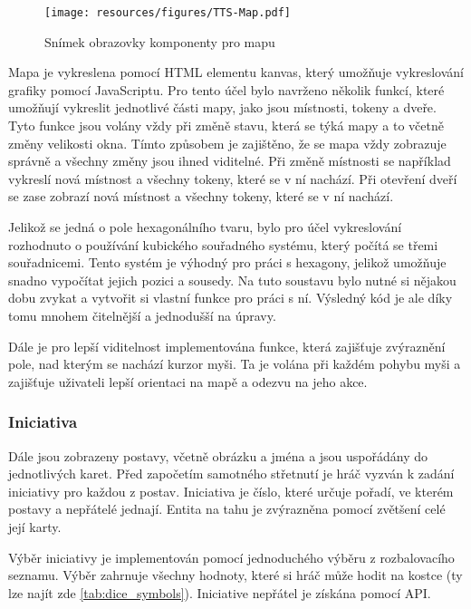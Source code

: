 \begin{figure}[H]
  \centering
  \texttt{[image: resources/figures/TTS-Map.pdf]}
  \caption{Snímek obrazovky komponenty pro mapu}
  \label{fig:map}
\end{figure}

Mapa je vykreslena pomocí HTML elementu kanvas, který umožňuje vykreslování grafiky pomocí JavaScriptu. Pro tento účel bylo navrženo několik funkcí, které umožňují vykreslit jednotlivé části mapy, jako jsou místnosti, tokeny a dveře. Tyto funkce jsou volány vždy při změně stavu, která se týká mapy a to včetně změny velikosti okna. Tímto způsobem je zajištěno, že se mapa vždy zobrazuje správně a všechny změny jsou ihned viditelné. Při změně místnosti se například vykreslí nová místnost a všechny tokeny, které se v ní nachází. Při otevření dveří se zase zobrazí nová místnost a všechny tokeny, které se v ní nachází. 

Jelikož se jedná o pole hexagonálního tvaru, bylo pro účel vykreslování rozhodnuto o používání kubického souřadného systému, který počítá se třemi souřadnicemi. Tento systém je výhodný pro práci s hexagony, jelikož umožňuje snadno vypočítat jejich pozici a sousedy. Na tuto soustavu bylo nutné si nějakou dobu zvykat a vytvořit si vlastní funkce pro práci s ní. Výsledný kód je ale díky tomu mnohem čitelnější a jednodušší na úpravy.

Dále je pro lepší viditelnost implementována funkce, která zajišťuje zvýraznění pole, nad kterým se nachází kurzor myši. Ta je volána při každém pohybu myši a zajišťuje uživateli lepší orientaci na mapě a odezvu na jeho akce.

\subsubsection*{Iniciativa}
Dále jsou zobrazeny postavy, včetně obrázku a jména a jsou uspořádány do jednotlivých karet. Před započetím samotného střetnutí je hráč vyzván k zadání iniciativy pro každou z postav. Iniciativa je číslo, které určuje pořadí, ve kterém postavy a nepřátelé jednají. Entita na tahu je zvýrazněna pomocí zvětšení celé její karty.

Výběr iniciativy je implementován pomocí jednoduchého výběru z rozbalovacího seznamu. Výběr zahrnuje všechny hodnoty, které si hráč může hodit na kostce (ty lze najít zde \ref{tab:dice_symbols}). Iniciative nepřátel je získána pomocí API.


